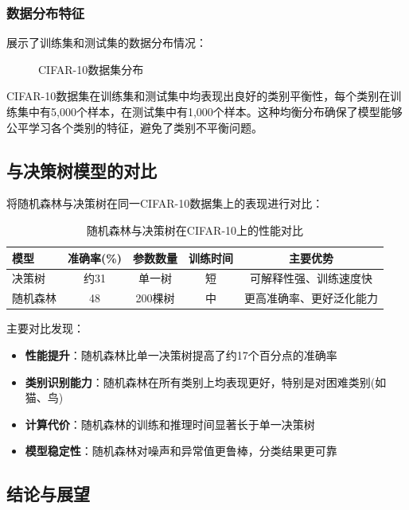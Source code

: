 \documentclass[UTF8]{report}
\theoremstyle{MyLineTheoremStyle} %
\theoremstyle{MyBlockTheoremStyle} %
\theoremstyle{MySubsubsectionStyle} %
\begin{document}
\subsubsection{数据分布特征}
展示了训练集和测试集的数据分布情况：

\begin{figure}[h]
\centering
\caption{CIFAR-10数据集分布}
\label{fig:rf_data_distribution}
\end{figure}

CIFAR-10数据集在训练集和测试集中均表现出良好的类别平衡性，每个类别在训练集中有5,000个样本，在测试集中有1,000个样本。这种均衡分布确保了模型能够公平学习各个类别的特征，避免了类别不平衡问题。

\subsection{与决策树模型的对比}

将随机森林与决策树在同一CIFAR-10数据集上的表现进行对比：

\begin{table}[h]
\centering
\caption{随机森林与决策树在CIFAR-10上的性能对比}
\begin{tabular}{l c c c c}
\toprule
\textbf{模型} & \textbf{准确率(\%)} & \textbf{参数数量} & \textbf{训练时间} & \textbf{主要优势} \\
\midrule
决策树 & 约31 & 单一树 & 短 & 可解释性强、训练速度快 \\
随机森林 & 48 & 200棵树 & 中 & 更高准确率、更好泛化能力 \\
\bottomrule
\end{tabular}
\end{table}

主要对比发现：
\begin{itemize}
    \item \textbf{性能提升}：随机森林比单一决策树提高了约17个百分点的准确率
    \item \textbf{类别识别能力}：随机森林在所有类别上均表现更好，特别是对困难类别(如猫、鸟)
    \item \textbf{计算代价}：随机森林的训练和推理时间显著长于单一决策树
    \item \textbf{模型稳定性}：随机森林对噪声和异常值更鲁棒，分类结果更可靠
\end{itemize}

\subsection{结论与展望}
\end{document}
